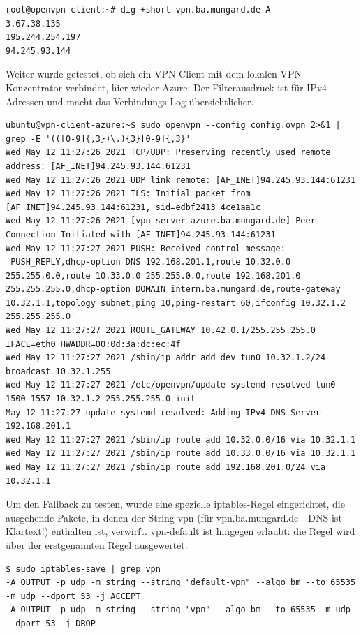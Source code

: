 \begin{lstlisting}[label=dig-matchall-ip,caption=.]
root@openvpn-client:~# dig +short vpn.ba.mungard.de A
3.67.38.135
195.244.254.197
94.245.93.144
\end{lstlisting}

Weiter wurde getestet, ob sich ein VPN-Client mit dem lokalen VPN-Konzentrator verbindet, hier wieder Azure:
Der Filterausdruck ist für IPv4-Adressen und macht das Verbindungs-Log übersichtlicher.
\begin{verbatim}
ubuntu@vpn-client-azure:~$ sudo openvpn --config config.ovpn 2>&1 | grep -E '(([0-9]{,3})\.){3}[0-9]{,3}'
Wed May 12 11:27:26 2021 TCP/UDP: Preserving recently used remote address: [AF_INET]94.245.93.144:61231
Wed May 12 11:27:26 2021 UDP link remote: [AF_INET]94.245.93.144:61231
Wed May 12 11:27:26 2021 TLS: Initial packet from [AF_INET]94.245.93.144:61231, sid=edbf2413 4ce1aa1c
Wed May 12 11:27:26 2021 [vpn-server-azure.ba.mungard.de] Peer Connection Initiated with [AF_INET]94.245.93.144:61231
Wed May 12 11:27:27 2021 PUSH: Received control message: 'PUSH_REPLY,dhcp-option DNS 192.168.201.1,route 10.32.0.0 255.255.0.0,route 10.33.0.0 255.255.0.0,route 192.168.201.0 255.255.255.0,dhcp-option DOMAIN intern.ba.mungard.de,route-gateway 10.32.1.1,topology subnet,ping 10,ping-restart 60,ifconfig 10.32.1.2 255.255.255.0'
Wed May 12 11:27:27 2021 ROUTE_GATEWAY 10.42.0.1/255.255.255.0 IFACE=eth0 HWADDR=00:0d:3a:dc:ec:4f
Wed May 12 11:27:27 2021 /sbin/ip addr add dev tun0 10.32.1.2/24 broadcast 10.32.1.255
Wed May 12 11:27:27 2021 /etc/openvpn/update-systemd-resolved tun0 1500 1557 10.32.1.2 255.255.255.0 init
May 12 11:27:27 update-systemd-resolved: Adding IPv4 DNS Server 192.168.201.1
Wed May 12 11:27:27 2021 /sbin/ip route add 10.32.0.0/16 via 10.32.1.1
Wed May 12 11:27:27 2021 /sbin/ip route add 10.33.0.0/16 via 10.32.1.1
Wed May 12 11:27:27 2021 /sbin/ip route add 192.168.201.0/24 via 10.32.1.1
\end{verbatim}

Um den Fallback zu testen, wurde eine spezielle iptables-Regel eingerichtet, die ausgehende Pakete, in denen der String \glqq vpn\grqq{} (für vpn.ba.mungard.de - DNS ist Klartext!) enthalten ist, verwirft. vpn-default ist hingegen erlaubt: die Regel wird über der erstgenannten Regel ausgewertet.

\begin{verbatim}
$ sudo iptables-save | grep vpn
-A OUTPUT -p udp -m string --string "default-vpn" --algo bm --to 65535 -m udp --dport 53 -j ACCEPT
-A OUTPUT -p udp -m string --string "vpn" --algo bm --to 65535 -m udp --dport 53 -j DROP
\end{verbatim}

